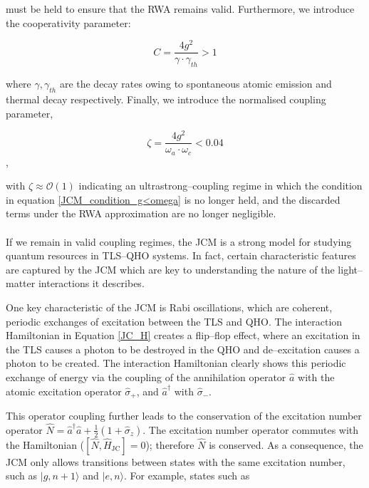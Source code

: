 \documentclass[11pt]{article}
\begin{document}
must be held to ensure that the RWA remains valid. Furthermore, we introduce the cooperativity parameter:

\begin{equation} \label{JCM_condition_cooperativity}
    C = \frac{4g^2}{\gamma\cdot\gamma_{\scriptscriptstyle th}} > 1
\end{equation}

where $\gamma, \gamma_{\scriptscriptstyle th}$ are the decay rates owing to spontaneous atomic emission and thermal decay respectively. Finally, we introduce the normalised coupling parameter, 

\begin{equation} \label{JCM_condition_norm_coupling}
    \zeta = \frac{4g^2}{\omega_a\cdot\omega_c} < 0.04
\end{equation}, 

with $\zeta \approx \mathcal{O}(1)$ indicating an ultrastrong--coupling regime in which the condition in equation \eqref{JCM_condition_g<omega} is no longer held, and the discarded terms under the RWA approximation are no longer negligible.\\
\\
If we remain in valid coupling regimes, the JCM is a strong model for studying quantum resources in TLS--QHO systems. In fact, certain characteristic features are captured by the JCM which are key to understanding the nature of the light--matter interactions it describes. 

One key characteristic of the JCM is Rabi oscillations, which are coherent, periodic exchanges of excitation between the TLS and QHO. The interaction Hamiltonian in Equation \eqref{JC_H} creates a flip--flop effect, where an excitation in the TLS causes a photon to be destroyed in the QHO and de--excitation causes a photon to be created. The interaction Hamiltonian clearly shows this periodic exchange of energy via the coupling of the annihilation operator $\hat{a}$ with the atomic excitation operator $\hat{\sigma}_+$, and $\hat{a}^\dagger$ with $\hat{\sigma}_-$.

This operator coupling further leads to the conservation of the excitation number operator $\hat{N} = \hat{a}^\dagger \hat{a} + \frac{1}{2}(1 + \hat{\sigma}_z)$. The excitation number operator commutes with the Hamiltonian ($[\hat{N}, \hat{H}_{\scriptscriptstyle \text{JC}}] = 0$); therefore $\hat{N}$ is conserved. As a consequence, the JCM only allows transitions between states with the same excitation number, such as $|g, n+1\rangle$ and $|e,n\rangle$. For example, states such as
\end{document}
